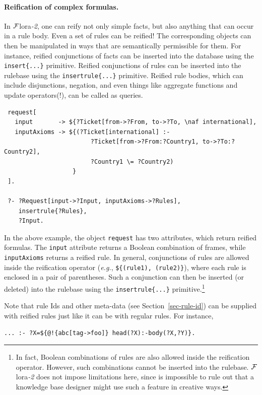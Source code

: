 \documentclass[11pt]{article}
\newcommand{\FLSYSTEM}{{\mbox{\sc ${\cal F}${lora}\rm\emph{-2}}}\xspace}
\begin{document}
\paragraph{Reification of complex formulas.}
In \FLSYSTEM, one can reify not only simple facts, but also anything that
can occur in a rule body. Even a set of rules can be reified!
The corresponding objects can then be manipulated in ways that are semantically
permissible for them. For instance, reified conjunctions of facts can be
inserted into the database using the \verb|insert{...}| primitive. 
Reified conjunctions of rules can be inserted into the rulebase using the
\verb|insertrule{...}| primitive. Reified rule bodies, which can include
disjunctions, negation, and even things like aggregate functions and update
operators(!), can be called as queries.
\begin{verbatim}
 request[
   input       -> ${?Ticket[from->?From, to->?To, \naf international],
   inputAxioms -> ${(?Ticket[international] :-
                        ?Ticket[from->?From:?Country1, to->?To:?Country2],
                        ?Country1 \= ?Country2)
                   }
 ].

 ?- ?Request[input->?Input, inputAxioms->?Rules],
    insertrule{?Rules},
    ?Input.
\end{verbatim}

In the above example, the object {\tt request} has two attributes, which
return reified formulas. The {\tt input} attribute returns a Boolean
combination of frames, while {\tt inputAxioms} returns a reified rule.
In general, conjunctions of rules are allowed inside the reification
operator ({\it e.g.}, \verb|${(rule1), (rule2)}|), where each rule is
enclosed in a pair of parentheses. Such a conjunction can then be inserted
(or deleted) into the rulebase using the {\tt insertrule\{...\}}
primitive.\footnote{
  In fact, Boolean combinations of rules are also allowed inside the
  reification operator. However, such combinations cannot be inserted into
  the rulebase. \FLSYSTEM does not impose limitations here, since is
  impossible to rule out that a knowledge base designer might use such a
  feature in creative ways.
}

Note that rule Ids and other meta-data (see
Section~\ref{sec-rule-id}) can be supplied with reified rules just like it
can be with regular rules. For instance,
\begin{verbatim}
... :- ?X=${@!{abc[tag->foo]} head(?X):-body(?X,?Y)}.
\end{verbatim}
\end{document}
